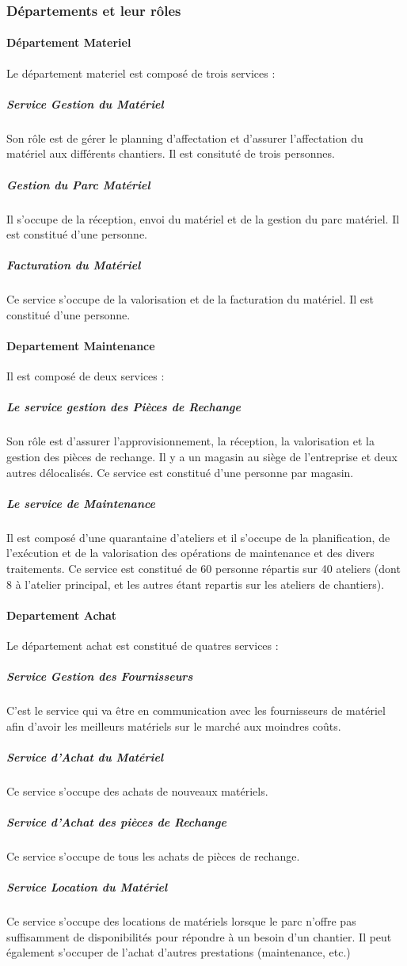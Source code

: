         \subsubsection{Départements et leur rôles}
            \paragraph{Département Materiel}
                Le département materiel est composé de trois services :
                \subparagraph{Service Gestion du Matériel}
                    Son rôle est de gérer le planning d’affectation et d’assurer l’affectation du matériel aux différents chantiers. Il est consituté de trois personnes.
                \subparagraph{Gestion du Parc Matériel}
                    Il s’occupe de la réception, envoi du matériel et de la gestion du parc matériel. Il est constitué d'une personne.
                \subparagraph{Facturation du Matériel}
                    Ce service s’occupe de la valorisation et de la facturation du matériel. Il est constitué d'une personne.        
                
            \paragraph{Departement Maintenance}
                Il est composé de deux services :

                \subparagraph{Le service gestion des Pièces de Rechange}
                    Son rôle est d’assurer l’approvisionnement, la réception, la valorisation et la gestion des pièces de rechange. Il y a un magasin au siège de l’entreprise et deux autres délocalisés. Ce service est constitué d'une personne par magasin.
                \subparagraph{Le service de Maintenance}
                    Il est composé d’une quarantaine d’ateliers et il s’occupe de la planification, de l’exécution et de la valorisation des opérations de maintenance et des divers traitements. Ce service est constitué de 60 personne répartis sur 40 ateliers (dont 8 à l’atelier principal, et les autres étant repartis sur les ateliers de chantiers).

            \paragraph{Departement Achat}
                Le département achat est constitué de quatres services :

                \subparagraph{Service Gestion des Fournisseurs}
	                C'est le service qui va être en communication avec les fournisseurs de matériel afin d'avoir les meilleurs matériels sur le marché aux moindres coûts.
                \subparagraph{Service d’Achat du Matériel}
	                Ce service s'occupe des achats de nouveaux matériels.
                \subparagraph{Service d’Achat des pièces de Rechange}
	                Ce service s'occupe de tous les achats de pièces de rechange.
                \subparagraph{Service Location du Matériel}
	                Ce service s'occupe des locations de matériels lorsque le parc n'offre pas suffisamment de disponibilités pour répondre à un besoin d'un chantier. Il peut également s’occuper de l’achat d’autres prestations (maintenance, etc.)
